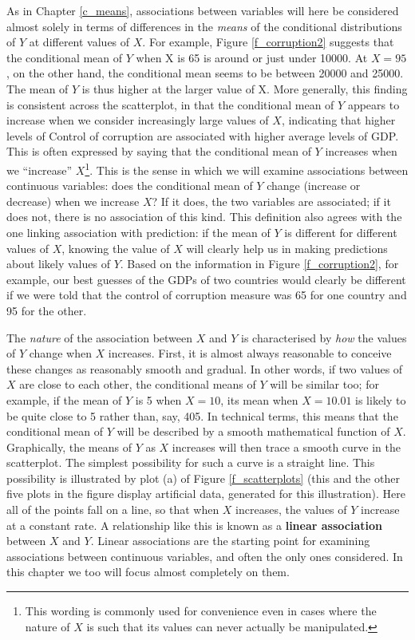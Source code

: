 As in Chapter \ref{c_means}, associations between variables will here
be considered almost solely in terms of differences in the \emph{means} of
the conditional distributions of $Y$ at different values of $X$. For
example, Figure \ref{f_corruption2} suggests that the conditional mean
of $Y$ when X is 65 is around or just under 10000. At $X=95$, on the
other hand, the conditional mean seems to be between 20000 and 25000.
The mean of $Y$ is thus higher at the larger value of X. More generally,
this finding is consistent across the scatterplot, in that the
conditional mean of $Y$ appears to increase when we consider
increasingly large values of $X$, indicating that higher levels of
Control of corruption are associated with higher average levels of GDP.
This is often expressed by saying that the conditional mean of $Y$
increases when we ``increase'' $X$\footnote{This wording is
commonly used for convenience even in cases where the nature of $X$ is such that its
values can never actually be manipulated.}.
This is the sense in which we will examine associations
between continuous variables: does the conditional mean of $Y$ change
(increase or decrease) when we increase $X$? If it does, the two
variables are associated; if it does not, there is no association of
this kind. This definition also agrees with the one linking
association with prediction: if the mean of $Y$ is
different for different values of $X$, knowing the value of $X$ will
clearly help us in making predictions about likely values of $Y$. Based
on the information in Figure \ref{f_corruption2}, for example, our best
guesses of the GDPs of two countries would clearly be different if we
were told that the control of corruption measure was 65 for one country
and 95 for the other.

The \emph{nature} of the association between $X$ and $Y$ is
characterised by \emph{how} the values of $Y$ change when $X$ increases.
First, it is almost always reasonable to conceive these changes as
reasonably smooth and gradual. In other words, if two values of $X$ are
close to each other, the conditional means of $Y$ will be similar too;
for example, if the mean of $Y$ is 5 when $X=10$, its mean when
$X=10.01$ is likely to be quite close to 5 rather than, say, 405. In
technical terms, this means that the conditional mean of $Y$ will be
described by a smooth mathematical function of $X$. Graphically, the
means of $Y$ as $X$ increases will then trace a smooth curve in the
scatterplot. The simplest possibility for such a curve is a straight
line. This possibility is illustrated by plot (a) of Figure
\ref{f_scatterplots} (this and the other five plots in the figure
display artificial data, generated for this illustration). Here all of
the points fall on a line, so that when $X$ increases, the values of $Y$
increase at a constant rate. A relationship like this is known as a
\textbf{linear association} between $X$ and $Y$. Linear associations are
the starting point for examining associations between continuous
variables, and often the only ones considered. In this chapter we too
will focus almost completely on them.


